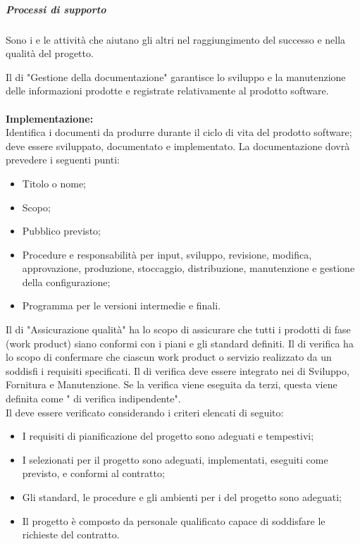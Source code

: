 \subparagraph{Processi di supporto}
Sono i  e le attività che aiutano gli altri  nel raggiungimento del successo e nella qualità del progetto.

\hbox{}
Il  di "Gestione della documentazione" garantisce lo sviluppo e la manutenzione delle informazioni prodotte e registrate relativamente al prodotto software. \\ \\
\textbf{Implementazione:} \\ 
Identifica i documenti da produrre durante il ciclo di vita del prodotto software;
deve essere sviluppato, documentato e implementato. La documentazione dovrà prevedere i seguenti punti: 
\begin{itemize}
    \item Titolo o nome;
    \item Scopo;
    \item Pubblico previsto;
    \item Procedure e responsabilità per input, sviluppo, revisione, modifica, approvazione, produzione, stoccaggio, distribuzione, manutenzione e gestione della configurazione;
    \item Programma per le versioni intermedie e finali.
\end{itemize}

\hbox{}
Il  di "Assicurazione qualità" ha lo scopo di assicurare che tutti i prodotti di fase (work product) siano conformi con i piani e gli standard definiti.
\hbox{}
Il  di verifica ha lo scopo di confermare che ciascun work product o servizio realizzato da un  soddisfi i requisiti specificati. 
Il  di verifica deve essere integrato nei  di Sviluppo, Fornitura e Manutenzione. Se la verifica viene eseguita da terzi, questa viene definita come " di verifica indipendente".
\\
Il  deve essere verificato considerando i criteri elencati di seguito:
\begin{itemize}
    \item I requisiti di pianificazione del progetto sono adeguati e tempestivi;
    \item I  selezionati per il progetto sono adeguati, implementati, eseguiti come previsto, e conformi al contratto;
    \item Gli standard, le procedure e gli ambienti per i  del progetto sono adeguati;
    \item Il progetto è composto da personale qualificato capace di soddisfare le richieste del contratto.
\end{itemize}

